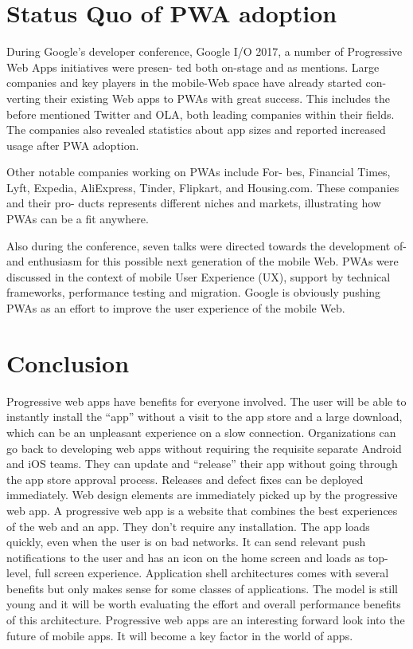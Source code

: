 \documentclass[14pt,a4paper,final]{extreport}
\begin{document}
\chapter{Status Quo of PWA adoption}
 During Google’s developer conference, Google I/O 2017, a number of Progressive Web Apps initiatives were presen- ted both on-stage and as mentions. Large companies and key players in the mobile-Web space have already started con- verting their existing Web apps to PWAs with great success. This includes the before mentioned Twitter and OLA, both leading companies within their fields. The companies also revealed statistics about app sizes and reported increased usage after PWA adoption.
 \item
\newline Other notable companies working on PWAs include For- bes, Financial Times, Lyft, Expedia, AliExpress, Tinder, Flipkart, and Housing.com. These companies and their pro- ducts represents different niches and markets, illustrating how PWAs can be a fit anywhere.
\item 
\newline Also during the conference, seven talks were directed towards the development of- and enthusiasm for this possible next generation of the mobile Web. PWAs were discussed in the context of mobile User Experience (UX), support by technical frameworks, performance testing and migration. Google is obviously pushing PWAs as an effort to improve the user experience of the mobile Web.


\chapter{Conclusion}
Progressive web apps have benefits for everyone involved. The user will be able to instantly install the “app” without a visit to the app store and a large download, which can be an unpleasant experience on a slow connection. Organizations can go back to developing web apps without requiring the requisite separate Android and iOS teams. They can update and “release” their app without going through the app store approval process. Releases and defect fixes can be deployed immediately. Web design elements are immediately picked up by the progressive web app.
A progressive web app is a website that combines the best experiences of the web and an app. They don't require any installation. The app loads quickly, even when the user is on bad networks. It can send relevant push notifications to the user and has an icon on the home screen and loads as top- level, full screen experience.
Application shell architectures comes with several benefits but only makes sense for some classes of applications. The model is still young and it will be worth evaluating the effort and overall performance benefits of this architecture. Progressive web apps are an interesting forward look into the future of mobile apps. It will become a key factor in the world of apps.
\end{document}
